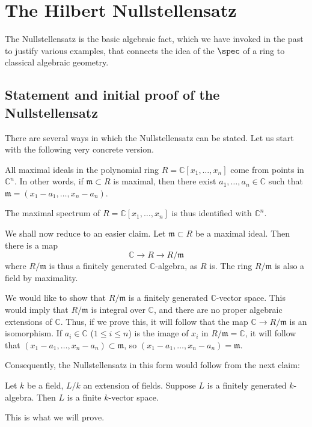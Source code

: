 \section{The Hilbert Nullstellensatz}

The Nullstellensatz is the basic algebraic fact, which we have invoked in the
past to justify various examples, that connects the idea of
the $\spec$ of a ring to classical algebraic geometry.

\subsection{Statement and initial proof of the Nullstellensatz}

There are several ways in which the Nullstellensatz can be stated. Let us
start with the following very concrete version.

\begin{theorem} \label{nullstellensatzoverC}
All maximal ideals in the polynomial ring $R=\mathbb{C}[x_1, \dots, x_n]$ come
from points in $\mathbb{C}^n$. In other words, if $\mathfrak{m} \subset R$ is
maximal, then there exist $a_1, \dots, a_n \in \mathbb{C}$ such that
$\mathfrak{m} = (x_1 - a_1, \dots, x_n - a_n)$.
\end{theorem}


The maximal spectrum of $R=\mathbb{C}[x_1, \dots, x_n]$ is thus identified with
$\mathbb{C}^n$.

We shall now reduce  to an easier claim.
Let
$\mathfrak{m}\subset R$ be a maximal ideal. Then there is a map
\[ \mathbb{C} \to R \to R/\mathfrak{m}  \]
where $R/\mathfrak{m}$ is thus a finitely generated $\mathbb{C}$-algebra, as
$R$ is.  The ring $R/\mathfrak{m}$ is also a field by maximality.

We would like to show that $R/\mathfrak{m}$ is a finitely generated
$\mathbb{C}$-vector
space. This would imply that $R/\mathfrak{m}$ is integral over $\mathbb{C}$,
and there are no proper algebraic extensions of $\mathbb{C}$. Thus, if we
prove this, it will follow that the map $\mathbb{C} \to R/\mathfrak{m}$ is an
isomorphism. If $a_i \in \mathbb{C}$ ($1 \leq i \leq n$) is the image of
$x_i $ in $R/\mathfrak{m} =
\mathbb{C}$, it will follow that $(x_1 - a_1, \dots, x_n - a_n) \subset
\mathfrak{m}$, so $(x_1 - a_1, \dots, x_n - a_n)=
\mathfrak{m}$.


Consequently, the Nullstellensatz in this form would follow from the next
claim:

\begin{proposition}
Let $k$ be a field, $L/k$ an extension of fields. Suppose $L$ is a finitely
generated $k$-algebra. Then $L$ is a finite $k$-vector space.
\end{proposition}
This is what we will prove.

